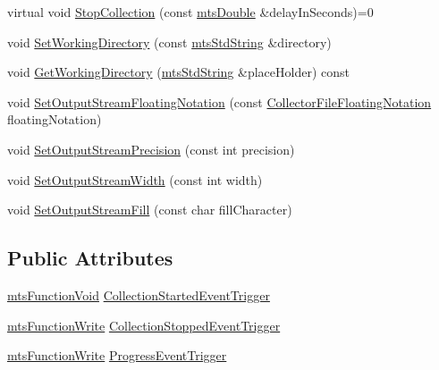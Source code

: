 \begin{DoxyCompactItemize}
\item 
virtual void \hyperlink{classmts_collector_base_a56f67fc120a7088b8d5904a3a785d5dd}{Stop\-Collection} (const \hyperlink{mts_generic_object_proxy_8h_a31e76b0190a8d3f9838626cd7b47bd75}{mts\-Double} \&delay\-In\-Seconds)=0
\item 
void \hyperlink{classmts_collector_base_a6983e4ef85748d0f898f69975147d0c2}{Set\-Working\-Directory} (const \hyperlink{mts_generic_object_proxy_8h_adbc21bfbf98367e582bf8a263b7e711f}{mts\-Std\-String} \&directory)
\item 
void \hyperlink{classmts_collector_base_ac53feb248d3ebd8056f7454855c1aba3}{Get\-Working\-Directory} (\hyperlink{mts_generic_object_proxy_8h_adbc21bfbf98367e582bf8a263b7e711f}{mts\-Std\-String} \&place\-Holder) const 
\item 
void \hyperlink{classmts_collector_base_a2d1f0135da1bdfcf964adf5add3848b1}{Set\-Output\-Stream\-Floating\-Notation} (const \hyperlink{classmts_collector_base_ad5d486fde9f8105e4de551d00026ea93}{Collector\-File\-Floating\-Notation} floating\-Notation)
\item 
void \hyperlink{classmts_collector_base_a0d118b2d074a7466b6b659a16dc4612c}{Set\-Output\-Stream\-Precision} (const int precision)
\item 
void \hyperlink{classmts_collector_base_a8ae87596c1de63ee54ffade9e21f35ad}{Set\-Output\-Stream\-Width} (const int width)
\item 
void \hyperlink{classmts_collector_base_a9e207050f00ef0132348e6f2321a451a}{Set\-Output\-Stream\-Fill} (const char fill\-Character)
\end{DoxyCompactItemize}
\subsection*{Public Attributes}
\begin{DoxyCompactItemize}
\item 
\hyperlink{classmts_function_void}{mts\-Function\-Void} \hyperlink{classmts_collector_base_aad959016aa62b9f20980c7cb61ccba8a}{Collection\-Started\-Event\-Trigger}
\item 
\hyperlink{classmts_function_write}{mts\-Function\-Write} \hyperlink{classmts_collector_base_a8caa04305488581107b1ad19087079a2}{Collection\-Stopped\-Event\-Trigger}
\item 
\hyperlink{classmts_function_write}{mts\-Function\-Write} \hyperlink{classmts_collector_base_a038835b577383fbc4b437ff60563b55b}{Progress\-Event\-Trigger}
\end{DoxyCompactItemize}
